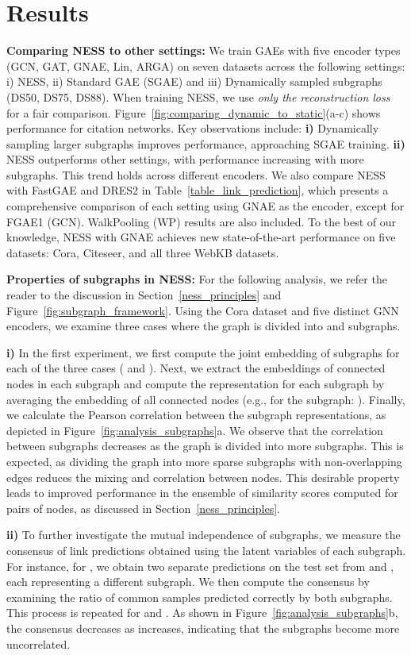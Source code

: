 \documentclass{article}
\begin{document}
\section{Results}\label{results}
\textbf{Comparing NESS to other settings:} We train GAEs with five encoder types (GCN, GAT, GNAE, Lin, ARGA) on seven datasets across the following settings: i) NESS, ii) Standard GAE (SGAE) and iii) Dynamically sampled subgraphs (DS50, DS75, DS88). When training NESS, we use \textit{only the reconstruction loss} for a fair comparison. Figure~\ref{fig:comparing_dynamic_to_static}(a-c) shows performance for citation networks. Key observations include: \textbf{i)} Dynamically sampling larger subgraphs improves performance, approaching SGAE training. \textbf{ii)} NESS outperforms other settings, with performance increasing with more subgraphs. This trend holds across different encoders. We also compare NESS with FastGAE and DRES2 in Table~\ref{table_link_prediction}, which presents a comprehensive comparison of each setting using GNAE as the encoder, except for FGAE1 (GCN). WalkPooling (WP) results are also included. To the best of our knowledge, NESS with GNAE achieves new state-of-the-art performance on five datasets: Cora, Citeseer, and all three WebKB datasets.


\textbf{Properties of subgraphs in NESS:}
For the following analysis, we refer the reader to the discussion in Section~\ref{ness_principles} and Figure~\ref{fig:subgraph_framework}. Using the Cora dataset and five distinct GNN encoders, we examine three cases where the graph is divided into  and  subgraphs.

\textbf{i)} In the first experiment, we first compute the joint embedding of subgraphs for each of the three cases ( and ). Next, we extract the embeddings of connected nodes in each subgraph and compute the representation for each subgraph by averaging the embedding of all connected nodes (e.g., for the  subgraph: ). Finally, we calculate the Pearson correlation between the subgraph representations, as depicted in Figure~\ref{fig:analysis_subgraphs}a. We observe that the correlation between subgraphs decreases as the graph is divided into more subgraphs. This is expected, as dividing the graph into more sparse subgraphs with non-overlapping edges reduces the mixing and correlation between nodes. This desirable property leads to improved performance in the ensemble of similarity scores computed for pairs of nodes, as discussed in Section~\ref{ness_principles}.

\textbf{ii)} To further investigate the mutual independence of subgraphs, we measure the consensus of link predictions obtained using the latent variables of each subgraph. For instance, for , we obtain two separate predictions on the test set from  and , each representing a different subgraph. We then compute the consensus by examining the ratio of common samples predicted correctly by both subgraphs. This process is repeated for  and . As shown in Figure~\ref{fig:analysis_subgraphs}b, the consensus decreases as  increases, indicating that the subgraphs become more uncorrelated.
\end{document}
